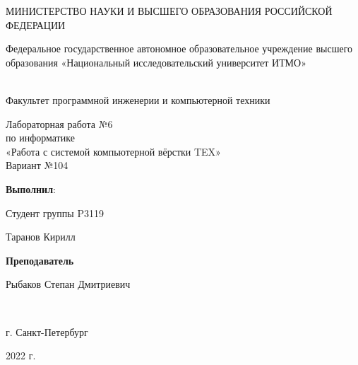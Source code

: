 % 
\pagestyle{empty}
\begin{center}
\hfill \break
\normalsize{МИНИСТЕРСТВО НАУКИ И ВЫСШЕГО ОБРАЗОВАНИЯ РОССИЙСКОЙ ФЕДЕРАЦИИ\par
Федеральное государственное автономное образовательное учреждение высшего образования 
«Национальный исследовательский университет ИТМО»
}\\
\large{Факультет программной инженерии и компьютерной техники}\\ 

\hfill \break
\hfill \break
\hfill \break
\hfill \break
\hfill \break
\hfill \break
\hfill \break

\large{Лабораторная работа №6\\по информатике\\«Работа с системой компьютерной вёрстки TEX»\\Вариант №104}\\
\hfill \break
\hfill \break
\hfill \break
\end{center}
\hfill \break
\normalsize{ 
\begin{flushright}
\textbf{Выполнил}:
\par
Студент группы P3119
\par
Таранов Кирилл
\par
\textbf{Преподаватель}
\par
Рыбаков Степан Дмитриевич

\end{flushright}
}\\
\hfill \break
\hfill \break
\hfill \break
\hfill \break
\hfill \break
\hfill \break
\begin{center} г. Санкт-Петербург 
\par
2022 г. 
\end{center}
%

